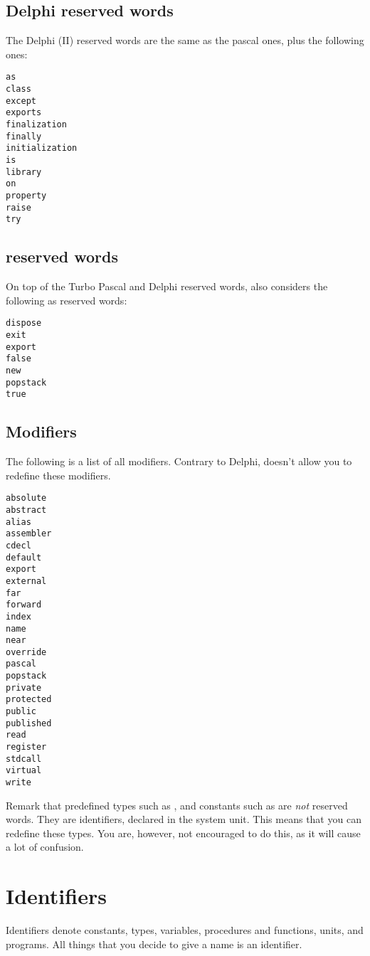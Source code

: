 \documentclass{report}
\begin{document}
\subsection{Delphi reserved words}
The Delphi (II) reserved words are the same as the pascal ones, plus the
following ones:
\begin{verbatim}
as
class
except
exports
finalization
finally
initialization
is
library
on
property
raise
try
\end{verbatim}
\latex{\end{multicols}}

\subsection{\fpc reserved words}
On top of the Turbo Pascal and Delphi reserved words, \fpc also considers
the following as reserved words:
\begin{verbatim}
dispose
exit
export
false
new
popstack
true
\end{verbatim}
\latex{\end{multicols}}

\subsection{Modifiers}
The following is a list of all modifiers. Contrary to Delphi, \fpc doesn't
allow you to redefine these modifiers.
\begin{verbatim}
absolute
abstract
alias
assembler
cdecl
default
export
external
far
forward
index
name
near
override
pascal
popstack
private
protected
public
published
read
register
stdcall
virtual
write
\end{verbatim}
\latex{\end{multicols}}
Remark that predefined types such as ,  and constants
such as  are {\em not} reserved words. They are
identifiers, declared in the system unit. This means that you can redefine
these types. You are, however, not encouraged to do this, as it will cause 
a lot of confusion.

\section{Identifiers}

Identifiers denote constants, types, variables, procedures and functions,
units, and programs. All things that you decide to give a name is an
identifier.
\end{document}
